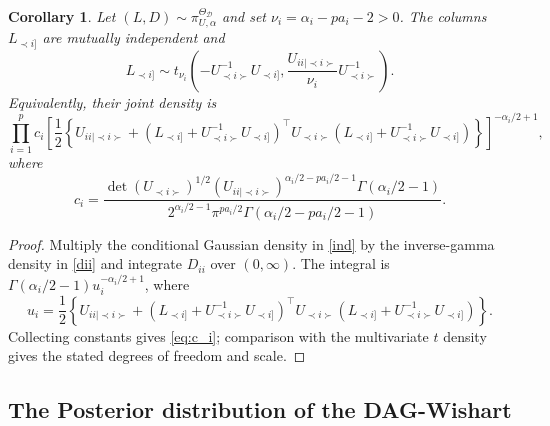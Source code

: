 \documentclass[12pt]{article}
\newcommand{\D}{\mathcal{D}}
\theoremstyle{plain}
\newtheorem{corollary}[theorem]{Corollary}
\theoremstyle{definition}
\theoremstyle{remark}
\begin{document}
\begin{corollary}\label{corr: tdisn}
Let \((L,D)\sim\pi^{\Theta_{\D}}_{U,\alpha}\) and set
\(\nu_i=\alpha_i-pa_i-2>0\).  The columns \(L_{\prec i]}\) are mutually
independent and
\[
L_{\prec i]}\sim
t_{\nu_i}\!\left(
-U_{\prec i\succ}^{-1}U_{\prec i]},
\frac{U_{ii\mid\prec i\succ}}{\nu_i}
U_{\prec i\succ}^{-1}\right).
\]
Equivalently, their joint density is
\[
\prod_{i=1}^{p}c_i
\left[
\frac12\left\{
U_{ii\mid\prec i\succ}
+(L_{\prec i]}+U_{\prec i\succ}^{-1}U_{\prec i]})^\top
U_{\prec i\succ}
(L_{\prec i]}+U_{\prec i\succ}^{-1}U_{\prec i]})
\right\}
\right]^{-\alpha_i/2+1},
\]
where
\begin{equation}\label{eq:c_i}
c_i=
\frac{\det(U_{\prec i\succ})^{1/2}
(U_{ii\mid\prec i\succ})^{\alpha_i/2-pa_i/2-1}
\Gamma(\alpha_i/2-1)}
{2^{\alpha_i/2-1}\pi^{pa_i/2}
\Gamma(\alpha_i/2-pa_i/2-1)}.
\end{equation}
\end{corollary}

\begin{proof}
Multiply the conditional Gaussian density in \eqref{ind} by the
inverse-gamma density in \eqref{dii} and integrate \(D_{ii}\) over
\((0,\infty)\).  The integral is
\(\Gamma(\alpha_i/2-1)u_i^{-\alpha_i/2+1}\), where
\[
u_i=\frac12\left\{
U_{ii\mid\prec i\succ}
+(L_{\prec i]}+U_{\prec i\succ}^{-1}U_{\prec i]})^\top
U_{\prec i\succ}
(L_{\prec i]}+U_{\prec i\succ}^{-1}U_{\prec i]})
\right\}.
\]
Collecting constants gives \eqref{eq:c_i}; comparison with the
multivariate \(t\) density gives the stated degrees of freedom and
scale.
\end{proof}
\subsection*{The Posterior distribution of the DAG-Wishart}
\end{document}
